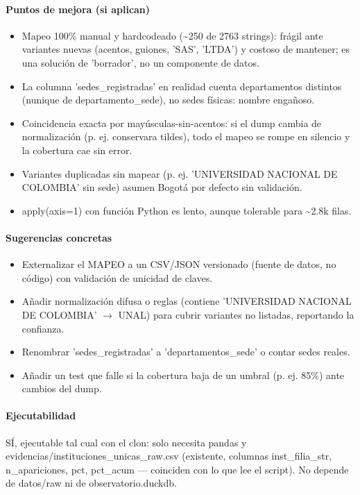 \paragraph{Puntos de mejora (si aplican)}
\begin{itemize}
  \item Mapeo 100\% manual y hardcodeado (\textasciitilde{}250 de 2763 strings): frágil ante variantes nuevas (acentos, guiones, 'SAS', 'LTDA') y costoso de mantener; es una solución de 'borrador', no un componente de datos.
  \item La columna 'sedes\_registradas' en realidad cuenta departamentos distintos (nunique de departamento\_sede), no sedes físicas: nombre engañoso.
  \item Coincidencia exacta por mayúsculas-sin-acentos: si el dump cambia de normalización (p. ej. conservara tildes), todo el mapeo se rompe en silencio y la cobertura cae sin error.
  \item Variantes duplicadas sin mapear (p. ej. 'UNIVERSIDAD NACIONAL DE COLOMBIA' sin sede) asumen Bogotá por defecto sin validación.
  \item apply(axis=1) con función Python es lento, aunque tolerable para \textasciitilde{}2.8k filas.
\end{itemize}

\paragraph{Sugerencias concretas}
\begin{itemize}
  \item Externalizar el MAPEO a un CSV/JSON versionado (fuente de datos, no código) con validación de unicidad de claves.
  \item Añadir normalización difusa o reglas (contiene 'UNIVERSIDAD NACIONAL DE COLOMBIA' $\rightarrow$ UNAL) para cubrir variantes no listadas, reportando la confianza.
  \item Renombrar 'sedes\_registradas' a 'departamentos\_sede' o contar sedes reales.
  \item Añadir un test que falle si la cobertura baja de un umbral (p. ej. 85\%) ante cambios del dump.
\end{itemize}

\paragraph{Ejecutabilidad}
SÍ, ejecutable tal cual con el clon: solo necesita pandas y evidencias/instituciones\_unicas\_raw.csv (existente, columnas inst\_filia\_str, n\_apariciones, pct, pct\_acum --- coinciden con lo que lee el script). No depende de datos/raw ni de observatorio.duckdb.

